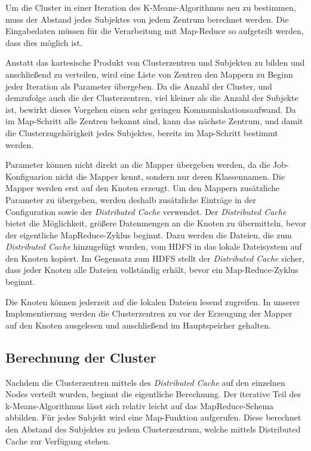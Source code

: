 \documentclass[a4paper]{llncs}
\begin{document}
Um die Cluster in einer Iteration des K-Means-Algorithmus neu zu bestimmen, muss der Abstand jedes Subjektes von jedem Zentrum berechnet werden. Die Eingabedaten müssen für die Verarbeitung mit Map-Reduce so aufgeteilt werden, dass dies möglich ist.

Anstatt das kartesische Produkt von Clusterzentren und Subjekten zu bilden und anschließend zu verteilen, wird eine Liste von Zentren den Mappern zu Beginn jeder Iteration als Parameter übergeben. Da die Anzahl der Cluster, und demzufolge auch die der Clusterzentren, viel kleiner als die Anzahl der Subjekte ist, bewirkt dieses Vorgehen einen sehr geringen Kommuniakationsaufwand. Da im Map-Schritt alle Zentren bekannt sind, kann das nächste Zentrum, und damit die Clusterzugehörigkeit jedes Subjektes, bereits im Map-Schritt bestimmt werden. 

Parameter können nicht direkt an die Mapper übergeben werden, da die Job-Konfiguarion nicht die Mapper kennt, sondern nur deren Klassennamen. Die Mapper werden erst auf den Knoten erzeugt. Um den Mappern zusätzliche Parameter zu übergeben, werden deshalb zusätzliche Einträge in der Configuration sowie der \emph{Distributed Cache} verwendet. Der \emph{Distributed Cache} bietet die Möglichkeit, größere Datenmengen an die Knoten zu übermitteln, bevor der eigentliche MapReduce-Zyklus beginnt. Dazu werden die Dateien, die zum \emph{Distributed Cache} hinzugefügt wurden, vom HDFS in das lokale Dateisystem auf den Knoten kopiert. Im Gegensatz zum HDFS stellt der \emph{Distributed Cache} sicher, dass jeder Knoten alle Dateien vollständig erhält, bevor ein Map-Reduce-Zyklus beginnt.

Die Knoten können jederzeit auf die lokalen Dateien lesend zugreifen. In unserer Implementierung werden die Clusterzentren zu vor der Erzeugung der Mapper auf den Knoten ausgelesen und anschließend im Hauptspeicher gehalten.

\subsection{Berechnung der Cluster}
Nachdem die Clusterzentren mittels des \emph{Distributed Cache} auf den einzelnen Nodes verteilt wurden, beginnt die eigentliche Berechnung.
Der iterative Teil des k-Means-Algorithmus lässt sich relativ leicht auf das MapReduce-Schema abbilden. Für jedes Subjekt wird eine Map-Funktion aufgerufen. 
Diese berechnet den Abstand des Subjektes zu jedem Clusterzentrum, welche mittels Distributed Cache zur Verfügung stehen.
\end{document}
